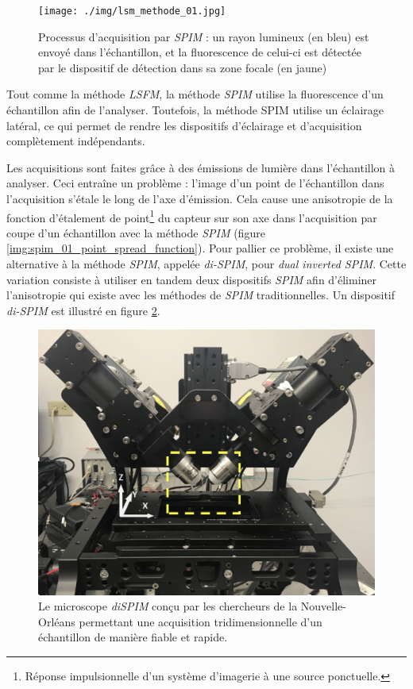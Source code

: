 {{        %
		\begin{figure}[!h]
			\centering
			\texttt{[image: ./img/lsm\_methode\_01.jpg]}
			\captionsetup{width=.8\linewidth}
			\caption{Processus d'acquisition par \textit{SPIM} : un rayon lumineux (en bleu) est envoyé dans l'échantillon, et la fluorescence de celui-ci est détectée par le dispositif de détection dans sa zone focale (en jaune)}
			\label{img:lsm_01_how_it_works}
		\end{figure}

		Tout comme la méthode \textit{LSFM}, la méthode \textit{SPIM} utilise la fluorescence d'un échantillon afin de l'analyser. Toutefois, la méthode SPIM utilise un éclairage latéral, ce qui permet de rendre les dispositifs d'éclairage et d'acquisition complètement indépendants.

		Les acquisitions sont faites grâce à des émissions de lumière dans l'échantillon à analyser. Ceci entraîne un problème : l'image d'un point de l'échantillon dans l'acquisition s'étale le long de l'axe d'émission. Cela cause une anisotropie de la fonction d'étalement de point\footnote{Réponse impulsionnelle d'un système d'imagerie à une source ponctuelle.} du capteur sur son axe dans l'acquisition par coupe d'un échantillon avec la méthode \textit{SPIM} (figure \ref{img:spim_01_point_spread_function}). Pour pallier ce problème, il existe une alternative à la méthode \textit{SPIM}, appelée \textit{di-SPIM}, pour \textit{dual inverted SPIM}. Cette variation consiste à utiliser en tandem deux dispositifs \textit{SPIM} afin d'éliminer l'anisotropie qui existe avec les méthodes de \textit{SPIM} traditionnelles. Un dispositif \textit{di-SPIM} est illustré en figure \ref{img:lsm_02_device}.

		\begin{figure}[!h]
			\centering
			\includegraphics[width=0.5\linewidth]{./img/lsm_device_02.png}
			\captionsetup{width=.8\linewidth}
			\caption{Le microscope \textit{diSPIM} conçu par les chercheurs de la Nouvelle-Orléans permettant une acquisition tridimensionnelle d'un échantillon de manière fiable et rapide.}
			\label{img:lsm_02_device}
		\end{figure}

}}
